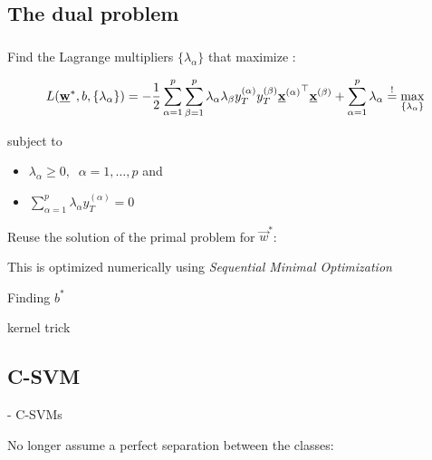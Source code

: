 \subsection{The dual problem}

\begin{frame}\frametitle{\subsecname}

Find the Lagrange multipliers $\{\lambda_{\alpha}\}$ that maximize \notesonly{\eqref{eq:lagrangiandual}}:

\begin{equation*}
L(\underline{\mathbf{w}}^*, b, \{\lambda_{\alpha}\})
= -\frac{1}{2} 
\sum_{\alpha=1}^{p} \sum_{\beta=1}^{p} 
\lambda_{\alpha} \lambda_{\beta} 
y_{T}^{(\alpha)} y_{T}^{(\beta)}
{\underline{\mathbf{x}}^{(\alpha)}}^\top  \underline{\mathbf{x}}^{(\beta)}
+ \sum_{\alpha=1}^{p} \lambda_{\alpha}
 \stackrel{\mathrm{!}}{=} \max_{\{\lambda_\alpha\}}
\end{equation*}

subject to 
\begin{itemize}
\item[] $\lambda_\alpha \ge 0,\;\; \alpha = 1,\ldots,p$ and
\item[]$\sum_{\alpha=1}^{p} \lambda_{\alpha} y_{T}^{(\alpha)} = 0$
\end{itemize}

Reuse the solution of the primal problem for $\vec w^*$:

This is optimized numerically using \emph{Sequential Minimal Optimization}


\end{frame}

\begin{frame}
Finding $b^{*}$    
\end{frame}

\begin{frame}


kernel trick
    
\end{frame}

\subsection{C-SVM}

\begin{frame}


- C-SVMs

No longer assume a perfect separation between the classes:

    
\end{frame}
